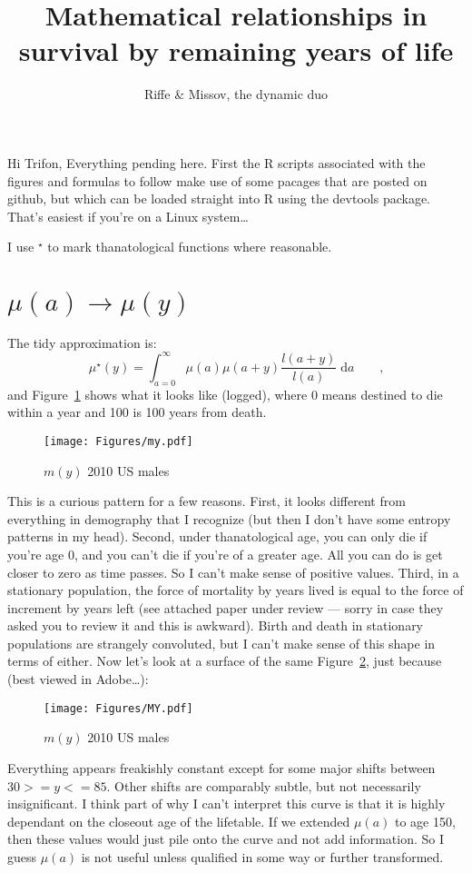 \documentclass{article}
\newcommand{\dd}{\; \mathrm{d}}
\newcommand{\ec}{\quad\quad\text{,}}
\begin{document}
\title{Mathematical relationships in survival by remaining years of life}
\author{Riffe \& Missov, the dynamic duo}
\maketitle

Hi Trifon,
Everything pending here. First the R scripts associated with the figures and
formulas to follow make use of some pacages that are posted on github, but which
can be loaded straight into R using the devtools package. That's easiest if
you're on a Linux system\ldots

I use $^\star$ to mark thanatological functions where reasonable.
\section{$\mu (a) \rightarrow \mu (y)$}

The tidy approximation is:
\begin{equation}
\mu^\star (y) = \int _{a=0}^\infty \mu (a) \mu (a+y) \frac{l(a+y)}{l(a)} \dd
a\ec
\end{equation}
and Figure~\ref{fig:my} shows what it looks like (logged), where 0 means
destined to die within a year and 100 is 100 years from death.
\begin{figure}[ht!]
\caption{$m(y)$ 2010 US males}
\label{fig:my}
\texttt{[image: Figures/my.pdf]}
\end{figure}

This is a curious pattern for a few reasons. First, it looks different from
everything in demography that I recognize (but then I don't have some entropy
patterns in my head). Second, under thanatological age, you can only die if
you're age 0, and you can't die if you're of a greater age. All you can do is get closer to zero as time passes. So I can't make sense of positive values. Third, in a
stationary population, the force of mortality by years lived is equal to the force of increment by years left (see
attached paper under review --- sorry in case they asked you to review it and
this is awkward). Birth and death in stationary populations are strangely
convoluted, but I can't make sense of this shape in terms of either. Now let's
look at a surface of the same Figure~\ref{fig:MY}, just because (best viewed in
Adobe\ldots):
\begin{figure}[ht!]
\caption{$m(y)$ 2010 US males}
\label{fig:MY}
\texttt{[image: Figures/MY.pdf]}
\end{figure}
Everything appears freakishly constant except for some major shifts between $30
>= y <= 85$. Other shifts are comparably subtle, but not necessarily
insignificant. I think part of why I can't interpret this curve is that it is
highly dependant on the closeout age of the lifetable. If we extended $\mu (a)$
to age 150, then these values would just pile onto the curve and not add
information. So I guess $\mu (a)$ is not useful unless qualified in some way or
further transformed. 
\end{document}
